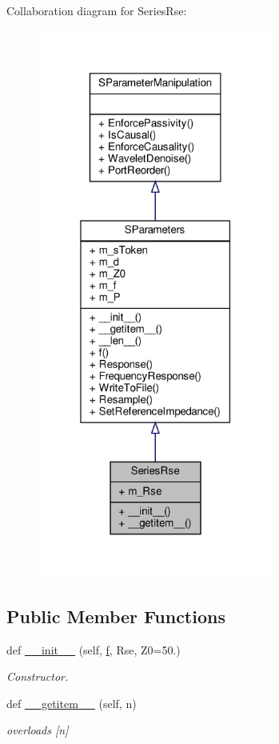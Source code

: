 Collaboration diagram for Series\+Rse\+:\nopagebreak
\begin{figure}[H]
\begin{center}
\leavevmode
\includegraphics[width=220pt]{classSignalIntegrity_1_1SParameters_1_1Devices_1_1SeriesRse_1_1SeriesRse__coll__graph}
\end{center}
\end{figure}
\subsection*{Public Member Functions}
\begin{DoxyCompactItemize}
\item 
def \hyperlink{classSignalIntegrity_1_1SParameters_1_1Devices_1_1SeriesRse_1_1SeriesRse_a669a93314734d1e46d96dbe25a94b13c}{\+\_\+\+\_\+init\+\_\+\+\_\+} (self, \hyperlink{classSignalIntegrity_1_1SParameters_1_1SParameters_1_1SParameters_a32e7a34d6837fe949b413c852a0447f8}{f}, Rse, Z0=50.)
\begin{DoxyCompactList}\small\item\em Constructor. \end{DoxyCompactList}\item 
def \hyperlink{classSignalIntegrity_1_1SParameters_1_1Devices_1_1SeriesRse_1_1SeriesRse_ab7a6da5139e0878b590d68292aaa70f2}{\+\_\+\+\_\+getitem\+\_\+\+\_\+} (self, n)
\begin{DoxyCompactList}\small\item\em overloads \mbox{[}n\mbox{]} \end{DoxyCompactList}\end{DoxyCompactItemize}


